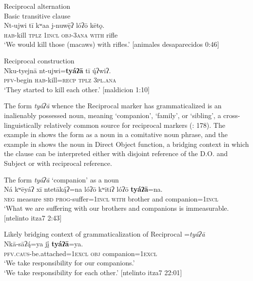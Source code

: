 \documentclass[output=paper]{../langscibook}
\begin{document}
\ea\label{ex:campbell:42}
{Reciprocal alternation}\\
\ea\label{ex:campbell:42a}
{  Basic transitive clause} \\
\gll Nt-ujwi  tī  kʷaa  j-nuw\={ę}ʔ  lóʔō  kētǫ.\\
     \textsc{hab-}kill  \textsc{tplz}  \textsc{1incl}  \textsc{obj-3ana}  \textsc{with}  rifle\\
\glt ‘We would kill those (macaws) with rifles.’ [animales desaparecidos 0:46]

\ex\label{ex:campbell:42b}
{  Reciprocal construction}\\
\gll Nku-tyejnā  nt-ujwi=\textbf{tyáʔā}  tī  \'{\k{u}}ʔwiʔ.\\
     \textsc{pfv-}begin  \textsc{hab-}kill=\textsc{recp}  \textsc{tplz}  \textsc{3pl.ana}\\
\glt ‘They started to kill each other.’ [maldicion 1:10]
\z
\z

The form \textit{tyáʔā} whence the Reciprocal marker has grammaticalized is an inalienably possessed noun, meaning ‘companion’, ‘family’,  or ‘sibling’, a cross-linguistically relatively common source for reciprocal markers (\citealt{HeineMiyashita2008}: 178). The example in  shows the form as a noun in a comitative noun phrase, and the example in  shows the noun in Direct Object function, a bridging context in which the clause can be interpreted either with disjoint reference of the D.O. and Subject or with reciprocal reference.


\ea\label{ex:campbell:43}
{The form \textit{tyáʔā} ‘companion’ as a noun}\\
\gll Ná  kʷēyáʔ  xī  ntetāk\'{ą}ʔ=na  lóʔō  kʷitiʔ  lóʔō  \textbf{tyáʔā}=na.\\
     \textsc{neg}  measure  \textsc{sbd}  \textsc{prog-}suffer=\textsc{1incl}  \textsc{with}  brother  and  companion=1\textsc{incl}\\
\glt ‘What we are suffering with our brothers and companions is immeasurable. [ntelinto itza7 2:43]
\z

\ea\label{ex:campbell:44}
{Likely bridging context of grammaticalization of Reciprocal =\textit{tyáʔā}}\\
\gll Nkā-sāʔ\'{ą}=ya  jį̄  \textbf{tyáʔā}=ya.\\
     \textsc{pfv.caus}{}-be.attached=1\textsc{excl}  \textsc{obj}  companion=\textsc{1excl}\\
\glt ‘We take responsibility for our companions.’\\
‘We take responsibility for each other.’ [ntelinto itza7 22:01]
\z
\end{document}
